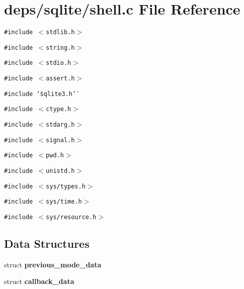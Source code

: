 \section{deps/sqlite/shell.c File Reference}
\label{shell_8c}
{\tt \#include $<$stdlib.h$>$}\par
{\tt \#include $<$string.h$>$}\par
{\tt \#include $<$stdio.h$>$}\par
{\tt \#include $<$assert.h$>$}\par
{\tt \#include \char`\"{}sqlite3.h\char`\"{}}\par
{\tt \#include $<$ctype.h$>$}\par
{\tt \#include $<$stdarg.h$>$}\par
{\tt \#include $<$signal.h$>$}\par
{\tt \#include $<$pwd.h$>$}\par
{\tt \#include $<$unistd.h$>$}\par
{\tt \#include $<$sys/types.h$>$}\par
{\tt \#include $<$sys/time.h$>$}\par
{\tt \#include $<$sys/resource.h$>$}\par
\subsection*{Data Structures}
\begin{CompactItemize}
\item 
struct \bf{previous\_\-mode\_\-data}
\item 
struct \bf{callback\_\-data}
\end{CompactItemize}

